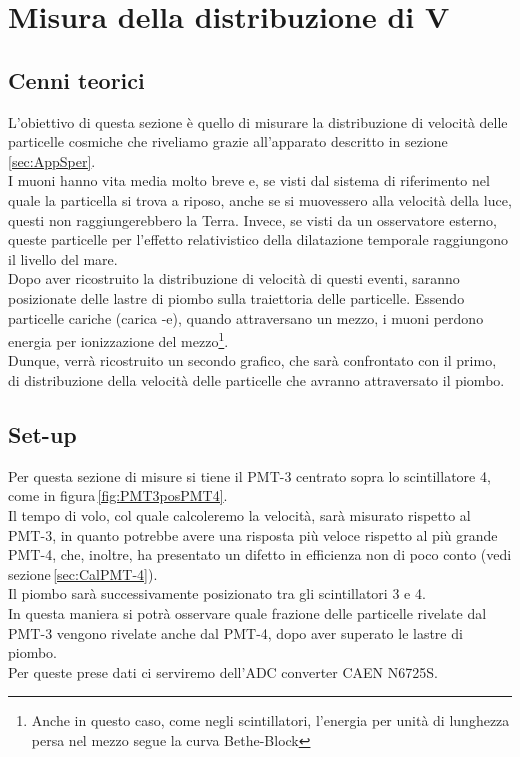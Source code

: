 \documentclass[a4paper,twocolumn]{article}
\begin{document}
\newpage
\section{Misura della distribuzione di V}
\label{sec:MisuraVMu}
\subsection{Cenni teorici}
L'obiettivo di questa sezione è quello di misurare la distribuzione di velocità delle particelle cosmiche che riveliamo grazie all'apparato descritto in sezione\,\ref{sec:AppSper}.\\
I muoni hanno vita media molto breve e, se visti dal sistema di riferimento nel quale la particella si trova a riposo, anche se si muovessero alla velocità della luce, questi non raggiungerebbero la Terra. Invece, se visti da un osservatore esterno, queste particelle per l'effetto relativistico della dilatazione temporale raggiungono il livello del mare.\\
Dopo aver ricostruito la distribuzione di velocità di questi eventi, saranno posizionate delle lastre di piombo sulla traiettoria delle particelle. Essendo particelle cariche (carica -e), quando attraversano un mezzo, i muoni perdono energia per ionizzazione del mezzo\footnote{Anche in questo caso, come negli scintillatori, l'energia per unità di lunghezza persa nel mezzo segue la curva Bethe-Block}.\\
Dunque, verrà ricostruito un secondo grafico, che sarà confrontato con il primo, di distribuzione della velocità delle particelle che avranno attraversato il piombo.


\subsection*{Set-up}
Per questa sezione di misure si tiene il PMT-3 centrato sopra lo scintillatore 4, come in figura\,\ref{fig:PMT3posPMT4}.\\
Il tempo di volo, col quale calcoleremo la velocità, sarà misurato rispetto al PMT-3, in quanto potrebbe avere una risposta più veloce rispetto al più grande PMT-4, che, inoltre, ha presentato un difetto in efficienza non di poco conto (vedi sezione\,\ref{sec:CalPMT-4}).\\
Il piombo sarà successivamente posizionato tra gli scintillatori 3 e 4.\\
In questa maniera si potrà osservare quale frazione delle particelle rivelate dal PMT-3 vengono rivelate anche dal PMT-4, dopo aver superato le lastre di piombo.\\
Per queste prese dati ci serviremo dell'ADC converter CAEN N6725S.
\end{document}
